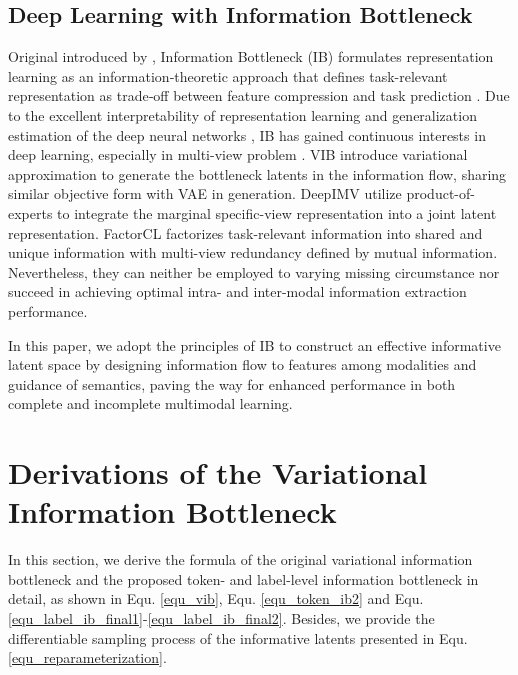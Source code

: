 \documentclass{article}
\begin{document}
\subsection{Deep Learning with Information Bottleneck}
Original introduced by \citet{tishby1999information}, Information Bottleneck (IB) formulates representation learning as an information‐theoretic approach that defines  task-relevant representation as trade‐off between feature compression and task prediction \cite{michael2018on}. Due to the excellent interpretability of representation learning and generalization estimation of the deep neural networks \cite{tishby2015deepib,shwartz2017opening,icml2023howdoesib}, IB has gained continuous interests in deep learning, especially in multi-view problem \cite{wang2019deep,federici2020Learning,Wan2021multiview}. VIB \cite{alemi2017vib} introduce variational approximation to generate the bottleneck latents in the information flow, sharing similar objective form with VAE \cite{kingma2014vae} in generation. DeepIMV \cite{lee2021deepimv} utilize product-of-experts to integrate the marginal specific-view representation into a joint latent representation. FactorCL \cite{liang2023factorized} factorizes task-relevant information into shared and unique information with multi-view redundancy defined by mutual information. Nevertheless, they can neither be employed to varying missing circumstance nor succeed in achieving optimal intra- and inter-modal information extraction performance. 

In this paper, we adopt the principles of IB to construct an effective informative latent space by designing information flow to features among modalities and guidance of semantics, paving the way for enhanced performance in both complete and incomplete multimodal learning.

\section{Derivations of the Variational Information Bottleneck}
\label{appendix_vib}
In this section, we derive the formula of the original variational information bottleneck and the proposed token- and label-level information bottleneck in detail, as shown in Equ. \ref{equ_vib}, Equ. \ref{equ_token_ib2} and Equ. \ref{equ_label_ib_final1}-\ref{equ_label_ib_final2}. Besides, we provide the differentiable sampling process of the informative latents presented in Equ. \ref{equ_reparameterization}.
\end{document}
